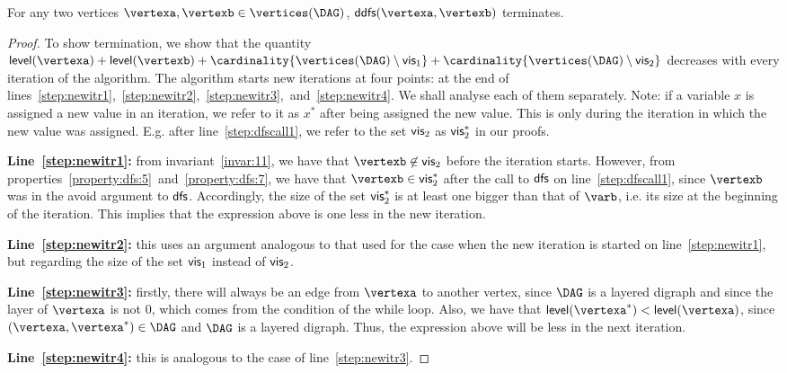 \begin{mythm}
  \label{thm:ddfsterminates}
  For any two vertices $\vertexa,\vertexb\in\vertices(\DAG)$, $\ddfs(\vertexa,\vertexb)$ terminates.
\end{mythm}
\begin{proof}
To show termination, we show that the quantity $\level(\vertexa)+\level(\vertexb)+\cardinality{\vertices(\DAG)\setminus\visa}+\cardinality{\vertices(\DAG)\setminus\visb}$ decreases with every iteration of the algorithm.
The algorithm starts new iterations at four points: at the end of lines~\ref{step:newitr1},~\ref{step:newitr2},~\ref{step:newitr3},~and~\ref{step:newitr4}.
We shall analyse each of them separately.
Note: if a variable $x$ is assigned a new value in an iteration, we refer to it as $x^*$ after being assigned the new value.
This is only during the iteration in which the new value was assigned.
E.g. after line~\ref{step:dfscall1}, we refer to the set $\textsf{\upshape vis}_2$ as $\textsf{\upshape vis}_2^*$ in our proofs.

{\bf Line~\ref{step:newitr1}:} from invariant~\ref{invar:11}, we have that $\vertexb\not\in\visb$ before the iteration starts.
However, from properties~\ref{property:dfs:5}~and~\ref{property:dfs:7}, we have that $\vertexb\in\visb^*$ after the call to $\textsf{\upshape dfs}$ on line~\ref{step:dfscall1}, since $\vertexb$ was in the avoid argument to $\textsf{\upshape dfs}$.
Accordingly, the size of the set $\textsf{\upshape vis}_2^*$ is at least one bigger than that of $\varb$, i.e. its size at the beginning of the iteration.
This implies that the expression above is one less in the new iteration.

{\bf Line~\ref{step:newitr2}:} this uses an argument analogous to that used for the case when the new iteration is started on line~\ref{step:newitr1}, but regarding the size of the set $\textsf{\upshape vis}_1$ instead of $\textsf{\upshape vis}_2$.

{\bf Line~\ref{step:newitr3}:} firstly, there will always be an edge from $\vertexa$ to another vertex, since $\DAG$ is a layered digraph and since the layer of $\vertexa$ is not $0$, which comes from the condition of the while loop.
Also, we have that $\level(\vertexa^*) < \level(\vertexa)$, since $(\vertexa, \vertexa^*)\in\DAG$ and $\DAG$ is a layered digraph.
Thus, the expression above will be less in the next iteration.

{\bf Line~\ref{step:newitr4}:} this is analogous to the case of line~\ref{step:newitr3}.
\end{proof}





